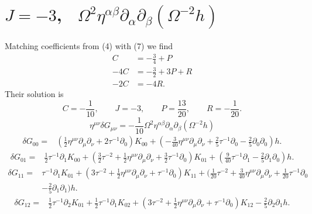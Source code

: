 \documentclass[10pt,letterpaper]{article}
\begin{document}
\section*{ $J=-3$, \ $\Omega^{2}\eta^{\alpha\beta}\partial_\alpha\partial_\beta (\Omega^{-2} h)$}
Matching coefficients from (4) with (7) we find
\begin{align}
	C &= -\frac34 + P\\
	-4C &= -\frac32 + 3P+R\\
	-2C &= -4R.
\end{align}
 Their solution is
\begin{equation}
	C = -\frac{1}{10},\qquad J=-3,\qquad P = \frac{13}{20},\qquad R =-\frac{1}{20}.
\end{equation}
\begin{equation}
\eta^{\mu\nu}\delta G_{\mu\nu} = -\frac{1}{10} \Omega^{2}\eta^{\alpha\beta}\partial_\alpha\partial_\beta (\Omega^{-2} h)
\end{equation}
\begin{align}
\delta G_{00}={}&(\tfrac{1}{2} \eta^{\mu \nu} \partial_{\mu} \partial_{\nu}
 + 2 \tau^{-1} \partial_{0}) K_{00}
 + (- \tfrac{3}{40} \eta^{\mu \nu} \partial_{\mu} \partial_{\nu}
 + \tfrac{2}{5} \tau^{-1} \partial_{0}
 -  \tfrac{2}{5} \partial_{0} \partial_{0}) h.
\end{align}
\begin{align}
\delta G_{01}={}&\tfrac{1}{2} \tau^{-1} \partial_{1} K_{00}
 + (\tfrac{3}{2} \tau^{-2}
 + \tfrac{1}{2} \eta^{\mu \nu} \partial_{\mu} \partial_{\nu}
 + \tfrac{3}{2} \tau^{-1} \partial_{0}) K_{01}
 + (\tfrac{9}{40} \tau^{-1} \partial_{1}
 -  \tfrac{2}{5} \partial_{1} \partial_{0}) h.
\end{align}
\begin{align}
\delta G_{11}={}&\tau^{-1} \partial_{1} K_{01}
 + (3 \tau^{-2}
 + \tfrac{1}{2} \eta^{\mu \nu} \partial_{\mu} \partial_{\nu}
 + \tau^{-1} \partial_{0}) K_{11}
 + (\tfrac{1}{20} \tau^{-2}
 + \tfrac{3}{40} \eta^{\mu \nu} \partial_{\mu} \partial_{\nu}
 + \tfrac{1}{20} \tau^{-1} \partial_{0}\nonumber\\
& -  \tfrac{2}{5} \partial_{1} \partial_{1}) h.
\end{align}
\begin{align}
\delta G_{12}={}&\tfrac{1}{2} \tau^{-1} \partial_{2} K_{01}
 + \tfrac{1}{2} \tau^{-1} \partial_{1} K_{02}
 + (3 \tau^{-2}
 + \tfrac{1}{2} \eta^{\mu \nu} \partial_{\mu} \partial_{\nu}
 + \tau^{-1} \partial_{0}) K_{12}
 -  \tfrac{2}{5} \partial_{2} \partial_{1} h.
\end{align}
\end{document}
